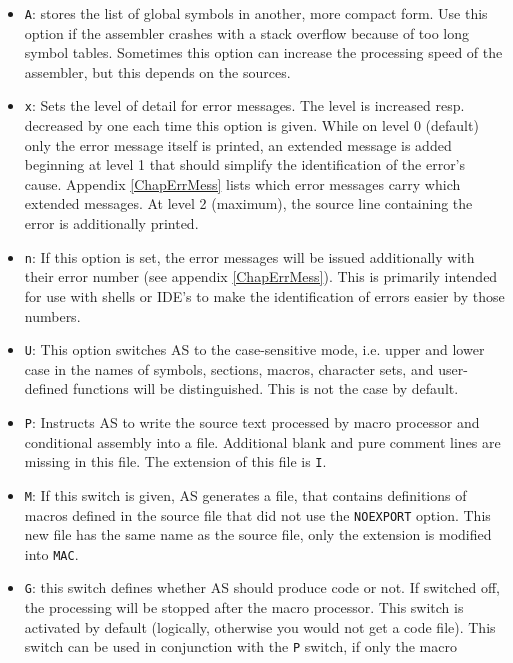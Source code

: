 \documentclass[12pt,twoside]{report}
\newcommand{\tty}[1]{{\tt #1}}
\newcommand{\asname}{{AS}}
\begin{document}
\begin{itemize}
{      case at this place!}
\item{\tty{A}: stores the list of global symbols in another, more compact
      form.  Use this option if the assembler crashes with a stack
      overflow because of too long symbol tables.  Sometimes this
      option can increase the processing speed of the assembler, but
      this depends on the sources.}
\item{\tty{x}: Sets the level of detail for error messages.  The level
      is increased resp. decreased by one each time this option is given.
      While on level 0 (default) only the error message itself is printed,
      an extended message is added beginning at level 1 that should
      simplify the identification of the error's cause.  Appendix
      \ref{ChapErrMess} lists which error messages carry which extended
      messages.  At level 2 (maximum), the source line containing the
      error is additionally printed.}
\item{\tty{n}: If this option is set, the error messages will be issued
      additionally with their error number (see appendix
      \ref{ChapErrMess}).  This is primarily intended for use with shells
      or IDE's to make the identification of errors easier by those
      numbers.}
\item{\tty{U}: This option switches \asname{} to the case-sensitive mode, i.e.
      upper and lower case in the names of symbols, sections, macros,
      character sets, and user-defined functions will be distinguished.
      This is not the case by default.}
\item{\tty{P}: Instructs \asname{} to write the source text processed by macro
      processor and conditional assembly into a file.  Additional
      blank and pure comment lines are missing in this file.  The
      extension of this file is \tty{I}.}
\item{\tty{M}: If this switch is given, \asname{} generates a file, that contains
      definitions of macros defined in the source file that did not
      use the \tty{NOEXPORT} option.  This new file has the same name as
      the source file, only the extension is modified into \tty{MAC}.}
\item{\tty{G}: this switch defines whether \asname{} should produce code or not.
      If switched off, the processing will be stopped after the macro
      processor. This switch is activated by default (logically,
      otherwise you would not get a code file). This switch can be
      used in conjunction with the \tty{P} switch, if only the macro
}
\end{itemize}
\end{document}
